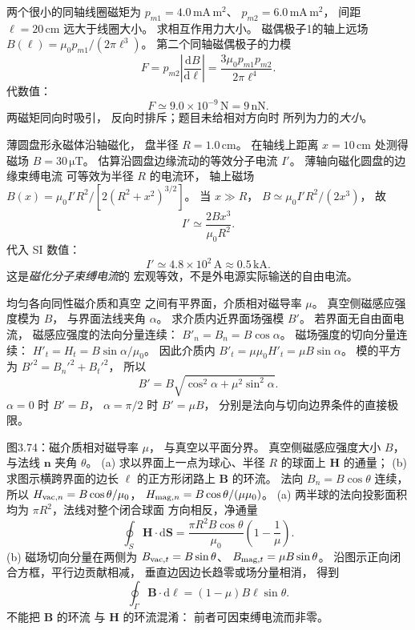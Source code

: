 两个很小的同轴线圈磁矩为
$p_{m1}=4.0\,\mathrm{mA\,m^2}$、
$p_{m2}=6.0\,\mathrm{mA\,m^2}$，
间距 $\ell=20\,\mathrm{cm}$
远大于线圈大小。
求相互作用力大小。
\exsolution
磁偶极子1的轴上远场
$B(\ell)=\mu_0p_{m1}/(2\pi\ell^3)$。
第二个同轴磁偶极子的力模
\[
F=p_{m2}\left|\frac{\mathrm dB}{\mathrm d\ell}\right|
=\frac{3\mu_0p_{m1}p_{m2}}{2\pi\ell^4}.
\]
代数值：
\[
\boxed{F\simeq9.0\times10^{-9}\,\mathrm N=9\,\mathrm{nN}}.
\]
\excheck 两磁矩同向时吸引，
反向时排斥；题目未给相对方向时
所列为力的\emph{大小}。

薄圆盘形永磁体沿轴磁化，
盘半径 $R=1.0\,\mathrm{cm}$。
在轴线上距离 $x=10\,\mathrm{cm}$
处测得磁场 $B=30\,\mathrm{\mu T}$。
估算沿圆盘边缘流动的等效分子电流 $I'$。
\exsolution
薄轴向磁化圆盘的边缘束缚电流
可等效为半径 $R$ 的电流环，
轴上磁场
$B(x)=\mu_0I'R^2/
[2(R^2+x^2)^{3/2}]$。
当 $x\gg R$，
$B\simeq\mu_0I'R^2/(2x^3)$，
故
\[
\boxed{I'\simeq\frac{2Bx^3}{\mu_0R^2}}.
\]
代入 SI 数值：
\[
\boxed{I'\simeq4.8\times10^2\,\mathrm A
\approx0.5\,\mathrm{kA}}.
\]
\excheck 这是\emph{磁化分子束缚电流}的
宏观等效，不是外电源实际输送的自由电流。

均匀各向同性磁介质和真空
之间有平界面，介质相对磁导率 $\mu$。
真空侧磁感应强度模为 $B$，
与界面法线夹角 $\alpha$。
求介质内近界面场强模 $B'$。
\exsolution
若界面无自由面电流，
磁感应强度的法向分量连续：
$B'_n=B_n=B\cos\alpha$。
磁场强度的切向分量连续：
$H'_t=H_t=B\sin\alpha/\mu_0$。
因此介质内
$B'_t=\mu\mu_0H'_t=\mu B\sin\alpha$。
模的平方为
$B'^2=B_n'^2+B_t'^2$，
所以
\[
\boxed{B'=B\sqrt{\cos^2\alpha+
\mu^2\sin^2\alpha}}.
\]
\excheck $\alpha=0$ 时 $B'=B$，
$\alpha=\pi/2$ 时 $B'=\mu B$，
分别是法向与切向边界条件的直接极限。

图3.74：磁介质相对磁导率 $\mu$，
与真空以平面分界。
真空侧磁感应强度大小 $B$，
与法线 $\bm n$ 夹角 $\theta$。
(a) 求以界面上一点为球心、半径 $R$
的球面上 $\bm H$ 的通量；
(b) 求图示横跨界面的边长 $\ell$
的正方形闭路上 $\bm B$ 的环流。
\exsolution
法向 $B_n=B\cos\theta$ 连续，
所以
$H_{{\rm vac},n}=B\cos\theta/\mu_0$，
$H_{{\rm mag},n}=B\cos\theta/(\mu\mu_0)$。
(a) 两半球的法向投影面积均为
$\pi R^2$，法线对整个闭合球面
方向相反，净通量
\[
\boxed{\oint_S\bm H\cdot\mathrm d\bm S
=\frac{\pi R^2B\cos\theta}{\mu_0}
\left(1-\frac1\mu\right)}.
\]
(b) 磁场切向分量在两侧为
$B_{{\rm vac},t}=B\sin\theta$、
$B_{{\rm mag},t}=\mu B\sin\theta$。
沿图示正向闭合方框，平行边贡献相减，
垂直边因边长趋零或场分量相消，
得到
\[
\boxed{\oint_\Gamma\bm B\cdot\mathrm d\bm\ell
=(1-\mu)B\ell\sin\theta}.
\]
\excheck 不能把 $\bm B$ 的环流
与 $\bm H$ 的环流混淆：
前者可因束缚电流而非零。
